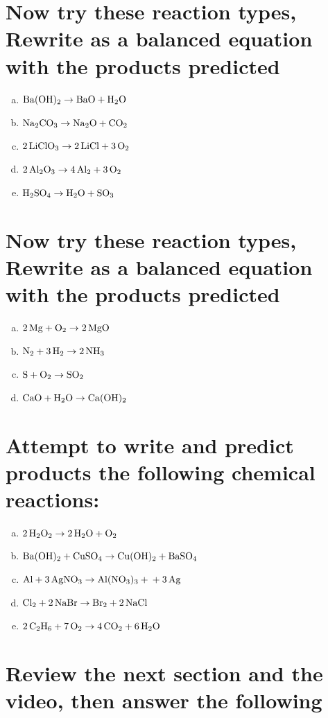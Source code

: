 \documentclass{scrartcl}
\begin{document}
\section{Now try these reaction types, Rewrite as a balanced equation with the products predicted}
\label{sec:orgbd17dff}
\begin{enumerate}[a.]
\item \(\ce{Ba(OH)2}\rightarrow\ce{BaO + H2O}\)
\item \(\ce{Na2CO3}\rightarrow\ce{Na2O + CO2}\)
\item \(\ce{2LiClO3}\rightarrow\ce{2LiCl + 3O2}\)
\item \(\ce{2Al2O3}\rightarrow\ce{4Al2 + 3O2}\)
\item \(\ce{H2SO4}\rightarrow\ce{H2O + SO3}\)
\end{enumerate}

\section{Now try these reaction types, Rewrite as a balanced equation with the products predicted}
\label{sec:orgfa30bf4}
\begin{enumerate}[a.]
\item \(\ce{2Mg + O2}\rightarrow\ce{2MgO}\)
\item \(\ce{N2 + 3H2}\rightarrow\ce{2NH3}\)
\item \(\ce{S + O2}\rightarrow\ce{SO2}\)
\item \(\ce{CaO + H2O}\rightarrow\ce{Ca(OH)2}\)
\end{enumerate}

\section{Attempt to write and predict products the following chemical reactions:}
\label{sec:org270d7a4}
\begin{enumerate}[a.]
\item \(\ce{2H2O2}\rightarrow\ce{2H2O + O2}\)
\item \(\ce{Ba(OH)2 + CuSO4}\rightarrow\ce{Cu(OH)2 + BaSO4}\)
\item \(\ce{Al + 3AgNO3}\rightarrow\ce{Al(NO3)3 + + 3Ag}\)
\item \(\ce{Cl2 + 2NaBr}\rightarrow\ce{Br2 + 2NaCl}\)
\item \(\ce{2C2H6 + 7O2}\rightarrow\ce{4CO2 + 6H2O}\)
\end{enumerate}

\section{Review the next section and the video, then answer the following}
\label{sec:org80269dd}
\end{document}
